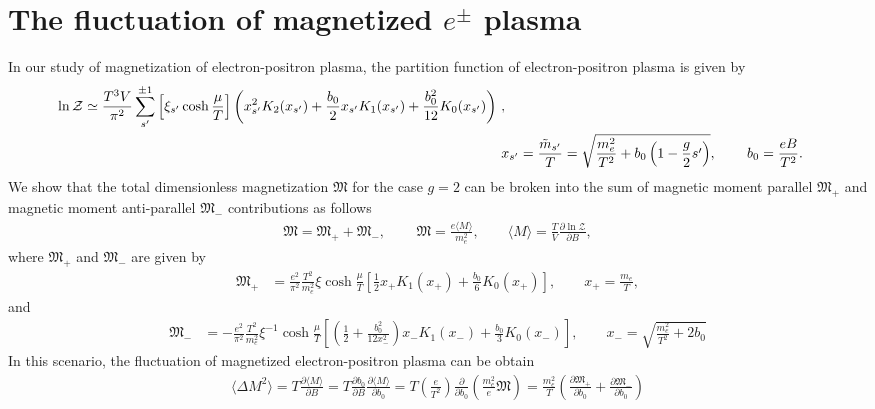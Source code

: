 \documentclass[onecolumn,preprintnumbers,amsmath,amssymb]{revtex4}
\begin{document}
\section{The fluctuation of magnetized $e^\pm$ plasma }
In our study of magnetization of electron-positron plasma, the partition function of electron-positron plasma is given by
\begin{align}
 \begin{split}
 \label{boltzmann}
 \ln{\cal Z}&\simeq\frac{T^{3}V}{\pi^{2}}\sum_{s'}^{\pm1}\left[\xi_{s'}\cosh{\frac{\mu}{T}}\right]\left(x_{s'}^{2}K_{2}(x_{s'})+\frac{b_{0}}{2}x_{s'}K_{1}(x_{s'})+\frac{b_{0}^{2}}{12}K_{0}(x_{s'})\right)\,,
 \end{split}\\
 \label{xfunc}
 x_{s'}&=\frac{{\tilde m}_{s'}}{T}=\sqrt{\frac{m_{e}^{2}}{T^{2}}+b_{0}\left(1-\frac{g}{2}s'\right)},\,\qquad b_0=\frac{eB}{T^2}.
\end{align}
We show that the total dimensionless magnetization ${\mathfrak M}$  for the case $g=2$ can be broken into the sum of magnetic moment parallel ${\mathfrak M}_{+}$ and magnetic moment anti-parallel ${\mathfrak M}_{-}$ contributions as follows
\begin{align}
\label{g2mag}
{\mathfrak M}={\mathfrak M}_{+}+{\mathfrak M}_{-},\,\qquad {\mathfrak M}=\frac{e\langle M\rangle}{m_e^2},\qquad \langle M\rangle=\frac{T}{V}\frac{\partial \ln{\mathcal Z}}{\partial B},\end{align}
where ${\mathfrak M}_{+}$ and ${\mathfrak M}_{-}$ are given by
\begin{align}
{\mathfrak M}_{+}&=\frac{e^{2}}{\pi^{2}}\frac{T^{2}}{m_{e}^{2}}\xi\cosh{\frac{\mu}{T}}\left[\frac{1}{2}x_{+}K_{1}(x_{+})+\frac{b_{0}}{6}K_{0}(x_{+})\right],\qquad x_{+}=\frac{m_{e}}{T},
\end{align}
and 
\begin{align}
{\mathfrak M}_{-}&=-\frac{e^{2}}{\pi^{2}}\frac{T^{2}}{m_{e}^{2}}\xi^{-1}\cosh{\frac{\mu}{T}}\left[\left(\frac{1}{2}+\frac{b_{0}^{2}}{12x_{-}^{2}}\right)x_{-}K_{1}(x_{-})+\frac{b_{0}}{3}K_{0}(x_{-})\right],  \qquad x_{-}=\sqrt{\frac{m_{e}^{2}}{T^{2}}+2b_{0}}
 \end{align}
 In this scenario, the fluctuation of magnetized electron-positron plasma can be obtain 
 \begin{align}
 \langle\Delta {M}^2\rangle=T\frac{\partial {\langle M\rangle} }{\partial B}=T\frac{\partial b_0}{\partial B}\frac{\partial {\langle M\rangle} }{\partial b_0}=T\left(\frac{e}{T^2}\right)\frac{\partial}{\partial b_0}\left(\frac{m^2_e}{e}{\mathfrak M}\right)=\frac{m_e^2}{T}\left(\frac{\partial {\mathfrak M}_{+} }{\partial b_0}+\frac{\partial {\mathfrak M} _{-}}{\partial b_0}\right)
 \end{align}
\end{document}
